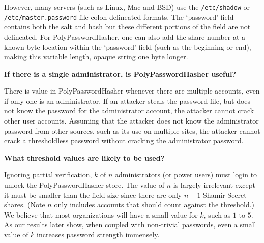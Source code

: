 However, 
many servers (such as Linux, Mac and BSD) use the {\tt /etc/shadow} or 
{\tt /etc/master.password} file 
colon delineated formats.
The `password' field contains both the salt and hash but these
different portions of the field are not 
delineated.  
For PolyPasswordHasher, one can also add the share number at a known byte location
within the `password' field (such as the beginning or end), making this
variable length, opaque string one byte longer.


{\bf If there is a single administrator, is PolyPasswordHasher useful?}

There is value in PolyPasswordHasher whenever there are multiple
accounts, even if only one is an administrator.   If an attacker steals the
password file, but does not know the password for the administrator account, 
the attacker cannot crack other user accounts.   
Assuming that the attacker does not know the administrator password
from other sources, such as its use on multiple sites, the 
attacker cannot crack a thresholdless password without cracking 
the administrator password.


{\bf What threshold values are likely to be used?}

Ignoring partial verification,
$k$ of $n$ administrators (or power users) must login to unlock the
PolyPasswordHasher store.   The value of $n$ is largely irrelevant
except it must be smaller than the field size since there are only $n-1$ 
Shamir Secret shares.   (Note $n$ only includes accounts that should count
against the threshold.)
%
We believe that most organizations will have a small 
value for $k$, such as $1$ to $5$.   As our results later show, 
when coupled with non-trivial passwords, even a small value of $k$ 
increases password strength immensely.



